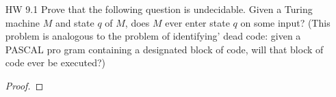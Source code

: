 \documentclass{article}
\theoremstyle{definition}
\newtheorem*{solution*}{Solution}
\begin{document}
\begin{enumerate}
\begin{solution*}
		Here is an example on a string of length 3. 
		\begin{align*}
		&\vdash aaa\textvisiblespace\ldots \\
		&\vdash aaa \dashv\textvisiblespace\ldots \\
		&\vdash \bar{a}\bar{a}\bar{a} \dashv\textvisiblespace\ldots \\
		&\vdash\$ \bar{a}\bar{a}\bar{a} \dashv \textvisiblespace\ldots\\
		&\vdash\hat{a}\hat{a}\hat{a}\$ \bar{a}\bar{a}\bar{a} \dashv\textvisiblespace\ldots \\
		&\vdash\hat{a}\hat{a}\$ \bar{a}\bar{a}\bar{a} \dashv\textvisiblespace\ldots \\
		&\vdash\textvisiblespace\hat{a}\$ \bar{a}\bar{a}\bar{a} \dashv\textvisiblespace\ldots\quad\text{ in 3 ``steps'' we get} \\
		&\vdash\textvisiblespace\hat{a}\$ \tilde{a}\tilde{a}\tilde{a}aaa \dashv\textvisiblespace\ldots \\
		&\vdash\textvisiblespace\hat{a}\$ \bar{a}\bar{a}\bar{a}aaa \dashv\textvisiblespace\ldots \\
		&\vdash\textvisiblespace\textvisiblespace\$ \bar{a}\bar{a}\bar{a}aaa \dashv\textvisiblespace\ldots \\
		&\vdash\textvisiblespace\textvisiblespace\$ \tilde{a}\tilde{a}\tilde{a}aaaaaa \dashv\textvisiblespace\ldots \\
		&\vdash\tilde{a}\tilde{a}\tilde{a}aaaaaa \dashv\textvisiblespace\ldots \\
		&\vdash aaaaaaaaa \dashv\textvisiblespace\ldots \\
		\end{align*}
		The main idea of the algorithm is that the $\hat{a}$ keep track how many times we want to multiply the string's length by itself. We only want $m-1\ \hat{a}$'s since we already have a $m$ $a$'s on the tape. Each time we say a $\hat{a}$, we increase the number of $a$'s on the right side by $m$. So, at the end of this process, the number of $a$'s on the right side will be $m + (m-1)m = m^2$. 
	\end{solution*}
	\item[HW 9.1] Prove that the following question is undecidable. Given a Turing machine $M$ and state $q$ of $M$, does $M$ ever enter state $q$ on some input?
	(This problem is analogous to the problem of identifying' dead code:
	given a PASCAL pro gram containing a designated block of code, will
	that block of code ever be executed?)
	\begin{proof}

\end{proof}
\end{enumerate}
\end{document}
